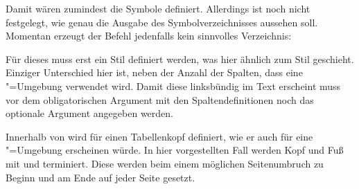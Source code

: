 \documentclass[%
  english,ngerman,%
  geometry=no,DIV=12,automark,%
]{tudscrartcl}
\begin{document}
%
Damit wären zumindest die Symbole definiert. Allerdings ist noch nicht 
festgelegt, wie genau die Ausgabe des Symbolverzeichnisses aussehen soll. 
Momentan erzeugt der Befehl  jedenfalls kein sinnvolles 
Verzeichnis:
%
\begin{Tutorial-}
\printsymbols
\end{Tutorial-}
\begin{quoting}[rightmargin=0pt]
\vspace*{-\baselineskip}
\glsdisablehyper
\printsymbols
\end{quoting}
%
Für dieses muss erst ein Stil definiert werden, was hier ähnlich zum Stil 
 geschieht. Einziger Unterschied hier ist, neben der 
Anzahl der Spalten, dass eine "=Umgebung verwendet wird. 
Damit diese linksbündig im Text erscheint muss vor dem obligatorischen Argument 
mit den Spaltendefinitionen noch das optionale Argument  angegeben 
werden.
%
\TutorialHook{\let\newglossarystyle\renewglossarystyle}
\begin{Tutorial}
\end{Tutorial}
%
Innerhalb von  wird  für einen
Tabellenkopf definiert, wie er auch für eine "=Umgebung 
erscheinen würde. In hier vorgestellten Fall werden Kopf und Fuß mit 
 und  terminiert. Diese werden beim einem 
möglichen Seitenumbruch zu Beginn und am Ende auf jeder Seite gesetzt.
\end{document}

